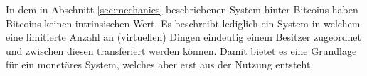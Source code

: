In dem in Abschnitt \ref{sec:mechanics} beschriebenen System hinter Bitcoins haben Bitcoins keinen intrinsischen Wert.
Es beschreibt lediglich ein System in welchem eine limitierte Anzahl an (virtuellen) Dingen eindeutig einem Besitzer zugeordnet und zwischen diesen transferiert werden können.
Damit bietet es eine Grundlage für ein monetäres System, welches aber erst aus der Nutzung entsteht.
